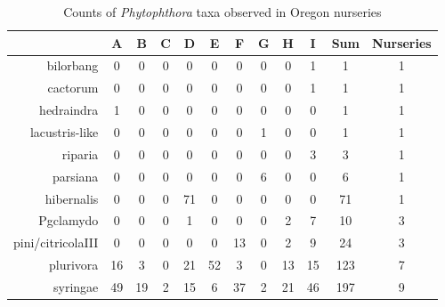\documentclass[12pt]{article}
\begin{document}
\begin{table}[ht]
\centering
\caption{Counts of \emph{Phytophthora} taxa observed in Oregon nurseries} 
\label{tab:taxa_counts}
\begin{tabular}{rccccccccccc}
  \hline
 & \textbf{A} & \textbf{B} & \textbf{C} & \textbf{D} & \textbf{E} & \textbf{F} & \textbf{G} & \textbf{H} & \textbf{I} & \textbf{Sum} & \textbf{Nurseries} \\ 
  \hline
bilorbang & 0 & 0 & 0 & 0 & 0 & 0 & 0 & 0 & 1 & 1 & 1 \\ 
  cactorum & 0 & 0 & 0 & 0 & 0 & 0 & 0 & 0 & 1 & 1 & 1 \\ 
  hedraindra  & 1 & 0 & 0 & 0 & 0 & 0 & 0 & 0 & 0 & 1 & 1 \\ 
  lacustris-like & 0 & 0 & 0 & 0 & 0 & 0 & 1 & 0 & 0 & 1 & 1 \\ 
  riparia & 0 & 0 & 0 & 0 & 0 & 0 & 0 & 0 & 3 & 3 & 1 \\ 
  parsiana & 0 & 0 & 0 & 0 & 0 & 0 & 6 & 0 & 0 & 6 & 1 \\ 
  hibernalis & 0 & 0 & 0 & 71 & 0 & 0 & 0 & 0 & 0 & 71 & 1 \\ 
  Pgclamydo & 0 & 0 & 0 & 1 & 0 & 0 & 0 & 2 & 7 & 10 & 3 \\ 
  pini/citricolaIII & 0 & 0 & 0 & 0 & 0 & 13 & 0 & 2 & 9 & 24 & 3 \\ 
  plurivora & 16 & 3 & 0 & 21 & 52 & 3 & 0 & 13 & 15 & 123 & 7 \\ 
  syringae & 49 & 19 & 2 & 15 & 6 & 37 & 2 & 21 & 46 & 197 & 9 \\ 
   \hline
\end{tabular}
\end{table}
\end{document}

